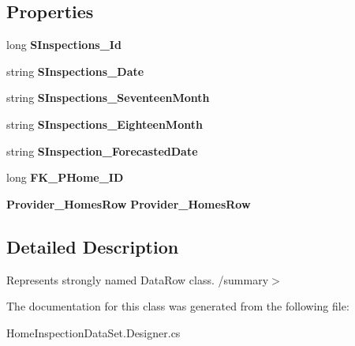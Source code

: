 \subsection*{Properties}
\begin{DoxyCompactItemize}
\item 
\mbox{\label{class_a_f_h___scheduler_1_1_home_inspection_data_set_1_1_scheduled___inspections_row_a218db97ba27ce533516ebfff1ade2869}} 
long {\bfseries S\+Inspections\+\_\+\+Id}\hspace{0.3cm}{\ttfamily  [get, set]}
\item 
\mbox{\label{class_a_f_h___scheduler_1_1_home_inspection_data_set_1_1_scheduled___inspections_row_a1fcf4d842a72d4dd46edd3de6c804305}} 
string {\bfseries S\+Inspections\+\_\+\+Date}\hspace{0.3cm}{\ttfamily  [get, set]}
\item 
\mbox{\label{class_a_f_h___scheduler_1_1_home_inspection_data_set_1_1_scheduled___inspections_row_ada1952b30ede463e5cdda8249538425b}} 
string {\bfseries S\+Inspections\+\_\+\+Seventeen\+Month}\hspace{0.3cm}{\ttfamily  [get, set]}
\item 
\mbox{\label{class_a_f_h___scheduler_1_1_home_inspection_data_set_1_1_scheduled___inspections_row_a8f3aa05acfe0f96f91e49a6ded90c0c5}} 
string {\bfseries S\+Inspections\+\_\+\+Eighteen\+Month}\hspace{0.3cm}{\ttfamily  [get, set]}
\item 
\mbox{\label{class_a_f_h___scheduler_1_1_home_inspection_data_set_1_1_scheduled___inspections_row_a25ea24e84b0fe5759c6808946f6b5533}} 
string {\bfseries S\+Inspection\+\_\+\+Forecasted\+Date}\hspace{0.3cm}{\ttfamily  [get, set]}
\item 
\mbox{\label{class_a_f_h___scheduler_1_1_home_inspection_data_set_1_1_scheduled___inspections_row_a0cf14787706bfc36372eb14176f38d32}} 
long {\bfseries F\+K\+\_\+\+P\+Home\+\_\+\+ID}\hspace{0.3cm}{\ttfamily  [get, set]}
\item 
\mbox{\label{class_a_f_h___scheduler_1_1_home_inspection_data_set_1_1_scheduled___inspections_row_a43ce999d1f9a995fbe36205ac7c77a39}} 
\textbf{ Provider\+\_\+\+Homes\+Row} {\bfseries Provider\+\_\+\+Homes\+Row}\hspace{0.3cm}{\ttfamily  [get, set]}
\end{DoxyCompactItemize}


\subsection{Detailed Description}
Represents strongly named Data\+Row class. /summary$>$ 

The documentation for this class was generated from the following file\+:\begin{DoxyCompactItemize}
\item 
Home\+Inspection\+Data\+Set.\+Designer.\+cs\end{DoxyCompactItemize}
